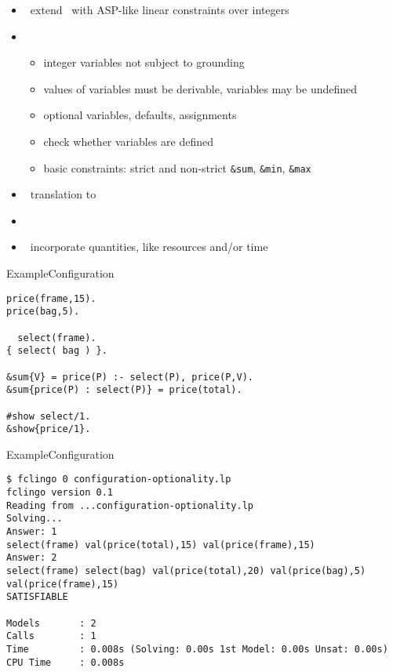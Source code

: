 \begin{frame}{\fclingo}
  \begin{itemize}
  \item {} \ extend \clingo\ with ASP-like linear constraints over integers
  \item {} \
    \begin{itemize}
    \item integer variables not subject to grounding
    \item values of variables must be derivable, variables may be undefined
    \item optional variables, defaults, assignments
    \item check whether variables are defined
    \item basic constraints: strict and non-strict \lstinline{&sum}, \lstinline{&min}, \lstinline{&max}
    \end{itemize}
  \item {} \ translation to \clingcon
  \item {} \ \cite{cafascwa20a,cafascwa20b}
  \item {} \ incorporate quantities, like resources and/or time
  \end{itemize}
\end{frame}
\begin{frame}[fragile]{Example}{Configuration}
\begin{lstlisting}
price(frame,15).
price(bag,5).

  select(frame).
{ select( bag ) }.

&sum{V} = price(P) :- select(P), price(P,V).
&sum{price(P) : select(P)} = price(total).

#show select/1.
&show{price/1}.
\end{lstlisting}
\end{frame}
\begin{frame}[fragile]{Example}{Configuration}
\begin{adjustbox}{max totalsize={\textwidth}{.83\textheight},keepaspectratio}
\begin{lstlisting}
$ fclingo 0 configuration-optionality.lp
fclingo version 0.1
Reading from ...configuration-optionality.lp
Solving...
Answer: 1
select(frame) val(price(total),15) val(price(frame),15)
Answer: 2
select(frame) select(bag) val(price(total),20) val(price(bag),5) val(price(frame),15)
SATISFIABLE

Models       : 2
Calls        : 1
Time         : 0.008s (Solving: 0.00s 1st Model: 0.00s Unsat: 0.00s)
CPU Time     : 0.008s
\end{lstlisting}
\end{adjustbox}
\end{frame}
%
